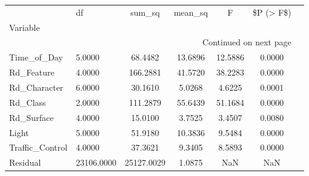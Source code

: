 \begin{longtable}{p{6cm}lccccc}
\toprule
{} &         df &     sum\_sq &  mean\_sq &       F &  \$P (> F\$) \\
Variable        &            &            &          &         &            \\
\midrule
\endhead
\midrule
\multicolumn{6}{r}{{Continued on next page}} \\
\midrule
\endfoot

\bottomrule
\endlastfoot
Time\_of\_Day     &     5.0000 &    68.4482 &  13.6896 & 12.5886 &     0.0000 \\
Rd\_Feature      &     4.0000 &   166.2881 &  41.5720 & 38.2283 &     0.0000 \\
Rd\_Character    &     6.0000 &    30.1610 &   5.0268 &  4.6225 &     0.0001 \\
Rd\_Class        &     2.0000 &   111.2879 &  55.6439 & 51.1684 &     0.0000 \\
Rd\_Surface      &     4.0000 &    15.0100 &   3.7525 &  3.4507 &     0.0080 \\
Light           &     5.0000 &    51.9180 &  10.3836 &  9.5484 &     0.0000 \\
Traffic\_Control &     4.0000 &    37.3621 &   9.3405 &  8.5893 &     0.0000 \\
Residual        & 23106.0000 & 25127.0029 &   1.0875 &     NaN &        NaN \\
\end{longtable}
